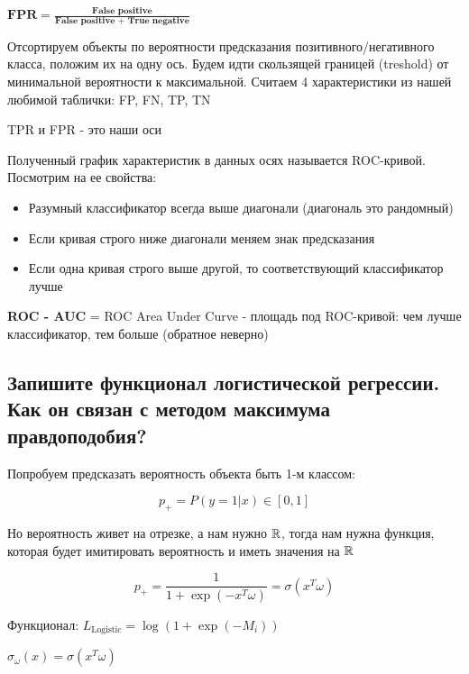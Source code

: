\begin{definition}
    $\textbf{FPR} = \frac{\textbf{False positive}}{\textbf{False positive + True negative}}$
\end{definition}

Отсортируем объекты по вероятности предсказания позитивного/негативного класса, положим их на одну ось. Будем идти скользящей границей (treshold) от минимальной вероятности к максимальной. Считаем 4 характеристики из нашей любимой таблички: FP, FN, TP, TN

TPR и FPR - это наши оси

Полученный график характеристик в данных осях называется ROC-кривой. Посмотрим на ее свойства:

\begin{itemize}
    \item Разумный классификатор всегда выше диагонали (диагональ это рандомный)
    \item Если кривая строго ниже диагонали меняем знак предсказания
    \item Если одна кривая строго выше другой, то соответствующий классификатор лучше
\end{itemize}

\begin{definition}
    \textbf{ROC - AUC} = ROC Area Under Curve - площадь под ROC-кривой: чем лучше классификатор, тем больше (обратное неверно)
\end{definition}








\subsection{Запишите функционал логистической регрессии. Как он связан с методом максимума
правдоподобия?}

Попробуем предсказать вероятность объекта быть 1-м классом:

$$p_+ = P(y = 1 | x) \in [0, 1]$$

Но вероятность живет на отрезке, а нам нужно $\mathbb{R}$, тогда нам нужна функция, которая будет имитировать вероятность и иметь значения на $\mathbb{R}$

$$p_+ = \frac{1}{1 + \exp(-x^T\omega)} = \sigma(x^T\omega)$$

Функционал: $L_{\text{Logistic}} = \log(1 + \exp(-M_i))$

\begin{note}
    $\sigma_{\omega}(x) = \sigma(x^T\omega)$
\end{note}

